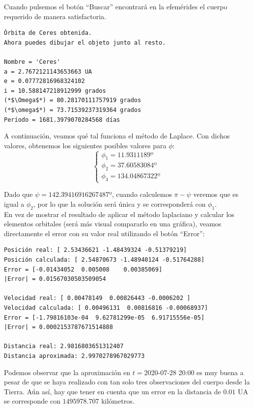 Cuando pulsemos el botón ``Buscar'' encontrará en la efemérides el cuerpo requerido de manera satisfactoria.
\begin{lstlisting}[style=Console]
Órbita de Ceres obtenida.
Ahora puedes dibujar el objeto junto al resto.

Nombre = 'Ceres'
a = 2.7672121143653663 UA
e = 0.07772816968324102
i = 10.588147218912999 grados
(*$\Omega$*) = 80.28170111757919 grados
(*$\omega$*) = 73.71539237319364 grados
Período = 1681.3979070284568 días
\end{lstlisting}

A continuación, veamos qué tal funciona el método de Laplace. Con dichos valores, obtenemos los siguientes posibles valores para $\phi$:
\[
\left\{
\begin{array}{l}
\phi_1=11.9311189º\\
\phi_2=37.60583084º\\
\phi_3=134.04867322º
\end{array}
\right.
\]

Dado que $\psi=142.39416916267487º$, cuando calculemos $\pi-\psi$ veremos que es igual a $\phi_2$, por lo que la solución será única y se corresponderá con $\phi_1$.\\

En vez de mostrar el resultado de aplicar el método laplaciano y calcular los elementos orbitales (será más visual compararlo en una gráfica), veamos directamente el error con su valor real utilizando el botón ``Error'':
\begin{lstlisting}[style=Console]
Posición real: [ 2.53436621 -1.48439324 -0.51379219]
Posición calculada: [ 2.54870673 -1.48940124 -0.51764288]
Error = [-0.01434052  0.005008    0.00385069]
|Error| = 0.01567030503509054

Velocidad real: [ 0.00478149  0.00826443 -0.0006202 ]
Velocidad calculada: [ 0.00496131  0.00816816 -0.00068937]
Error = [-1.79816103e-04  9.62781299e-05  6.91715556e-05]
|Error| = 0.0002153787671514888

Distancia real: 2.9816803651312407
Distancia aproximada: 2.9970278967029773
\end{lstlisting}

Podemos observar que la aproximación en $t=$2020-07-28 20:00 es muy buena a pesar de que se haya realizado con tan solo tres observaciones del cuerpo desde la Tierra. Aún así, hay que tener en cuenta que un error en la distancia de $0.01$ UA se corresponde con $1495978.707$ kilómetros.\\

